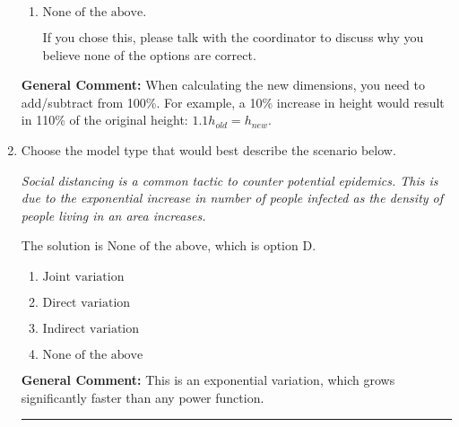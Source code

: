\documentclass{extbook}[14pt]
\newcommand{\litem}[1]{\item #1

\rule{\textwidth}{0.4pt}}
\begin{document}
\begin{enumerate}
{\begin{enumerate}[label=\Alph*.]
This corresponds to the model: $V = (1.14 r)^2 (0.90 h)$.
\item \( \text{None of the above.} \)

If you chose this, please talk with the coordinator to discuss why you believe none of the options are correct.
\end{enumerate}

\textbf{General Comment:} When calculating the new dimensions, you need to add/subtract from 100\%. For example, a 10\% increase in height would result in 110\% of the original height: $1.1h_{old} = h_{new}$.
}
\litem{
Choose the model type that would best describe the scenario below.

\begin{center}
    \textit{ Social distancing is a common tactic to counter potential epidemics. This is due to the exponential increase in number of people infected as the density of people living in an area increases. }
\end{center}
The solution is \( \text{None of the above} \), which is option D.\begin{enumerate}[label=\Alph*.]
\item \( \text{Joint variation} \)


\item \( \text{Direct variation} \)


\item \( \text{Indirect variation} \)


\item \( \text{None of the above} \)


\end{enumerate}

\textbf{General Comment:} This is an exponential variation, which grows significantly faster than any power function.
}
\end{enumerate}
\end{document}
